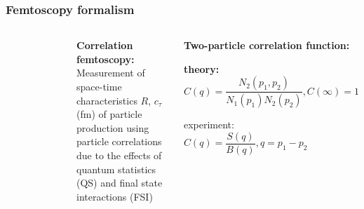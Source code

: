 \documentclass[dvipsnames] {beamer}
\begin{document}
\begin{frame}[shrink=40]
  \bf
  \frametitle{\bf \centering Femtoscopy formalism}
  \begin{columns}[c]
    \begin{block}{}
      \begin{figure}[H]
        \includegraphics[width=1.\linewidth]{corr_femto1.png}
      \end{figure}
    \end{block}
    \begin{block}{{\bf \centering Correlation femtoscopy:}}
        Measurement of space-time characteristics $R$, $c_{\tau}$ (fm) of particle production
        using particle correlations due to the effects of quantum statistics (QS) and final state interactions (FSI)
    \end{block}
      \begin{block}{{\bf \centering Two-particle correlation function:}}
        \begin{center}
          {\bf theory:     $C(q) = \dfrac{N_{2}(p_{1}, p_{2})}{N_{1}(p_{1}) N_{2}(p_{2})}, C(\infty) = 1$
        
            experiment: $C(q) = \dfrac{S(q)}{B(q)}, q = p_{1} - p_{2}$
            
}
\end{center}
\end{block}
\end{columns}
\end{frame}
\end{document}

